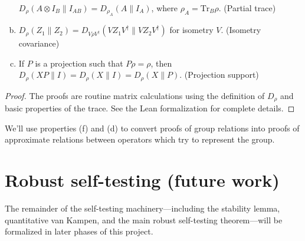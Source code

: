 \begin{lemma}
\begin{enumerate}[(a)]
		$D_\rho(A\otimes I_B \| I_{AB}) = D_{\rho_A}(A \| I_A)$, where $\rho_A = \mathrm{Tr}_B \rho$. (Partial trace)
		\item \label{item:state-dependent-distance-isometry}
		$D_\rho(Z_1 \| Z_2) = D_{V\rho V^\dagger}(VZ_1V^\dagger \| VZ_2V^\dagger)$ for isometry $V$. (Isometry covariance)
		\item\label{item:state-dependent-distance-projection-is-identity}
		If $P$ is a projection such that $P\rho = \rho$, then $D_\rho(XP \| I) = D_\rho(X \| I) = D_\rho(X \| P)$. (Projection support)
	\end{enumerate}
\end{lemma}

\begin{proof}
The proofs are routine matrix calculations using the definition of $D_\rho$ and basic properties of the trace. See the Lean formalization for complete details.
\end{proof}

We'll use properties (f) and (d) to convert proofs of group relations into proofs of approximate relations between operators which try to represent the group.

\section{Robust self-testing (future work)}

The remainder of the self-testing machinery---including the stability lemma, quantitative van Kampen, and the main robust self-testing theorem---will be formalized in later phases of this project.
